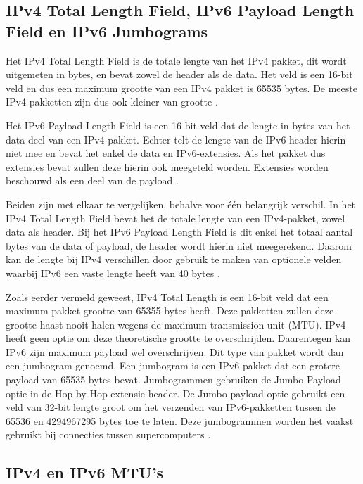 \subsection{IPv4 Total Length Field, IPv6 Payload Length Field en IPv6 Jumbograms}

Het IPv4 Total Length Field is de totale lengte van het IPv4 pakket, dit wordt uitgemeten in bytes, en bevat zowel de header als de data. Het veld is een 16-bit veld en dus een maximum grootte van een IPv4 pakket is 65535 bytes. De meeste IPv4 pakketten zijn dus ook kleiner van grootte \autocite{Graziani2017}.

Het IPv6 Payload Length Field is een 16-bit veld dat de lengte in bytes van het data deel van een IPv4-pakket. Echter telt de lengte van de IPv6 header hierin niet mee en bevat het enkel de data en IPv6-extensies. Als het pakket dus extensies bevat zullen deze hierin ook meegeteld worden. Extensies worden beschouwd als een deel van de payload \autocite{Graziani2017}.

Beiden zijn met elkaar te vergelijken, behalve voor één belangrijk verschil. In het IPv4 Total Length Field bevat het de totale lengte van een IPv4-pakket, zowel data als header. Bij het IPv6 Payload Length Field is dit enkel het totaal aantal bytes van de data of payload, de header wordt hierin niet meegerekend. Daarom kan de lengte bij IPv4 verschillen door gebruik te maken van optionele velden waarbij IPv6 een vaste lengte heeft van 40 bytes \autocite{Graziani2017}.

Zoals eerder vermeld geweest, IPv4 Total Length is een 16-bit veld dat een maximum pakket grootte van 65355 bytes heeft. Deze pakketten zullen deze grootte haast nooit halen wegens de maximum transmission unit (MTU). IPv4 heeft geen optie om deze theoretische grootte te overschrijden. Daarentegen kan IPv6 zijn maximum payload wel overschrijven. Dit type van pakket wordt dan een jumbogram genoemd. Een jumbogram is een IPv6-pakket dat een grotere payload van 65535 bytes bevat. Jumbogrammen gebruiken de Jumbo Payload optie in de Hop-by-Hop extensie header. De Jumbo payload optie gebruikt een veld van 32-bit lengte groot om het verzenden van IPv6-pakketten tussen de 65536 en 4294967295 bytes toe te laten. Deze jumbogrammen worden het vaakst gebruikt bij connecties tussen supercomputers \autocite{Graziani2017}.

\subsection{IPv4 en IPv6 MTU's}

